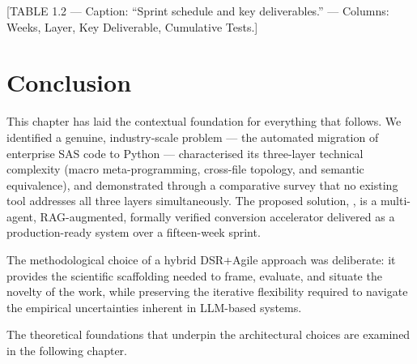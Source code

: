 [TABLE 1.2 --- Caption: ``Sprint schedule and key deliverables.'' --- Columns:
Weeks, Layer, Key Deliverable, Cumulative Tests.]

\section{Conclusion}
\label{sec:ch1-conclusion}

This chapter has laid the contextual foundation for everything that follows.
We identified a genuine, industry-scale problem --- the automated migration of
enterprise SAS code to Python --- characterised its three-layer technical
complexity (macro meta-programming, cross-file topology, and semantic
equivalence), and demonstrated through a comparative survey that no existing
tool addresses all three layers simultaneously. The proposed solution,
\codara{}, is a multi-agent, \ac{RAG}-augmented, formally verified conversion
accelerator delivered as a production-ready system over a fifteen-week sprint.

The methodological choice of a hybrid \ac{DSR}+Agile approach was deliberate:
it provides the scientific scaffolding needed to frame, evaluate, and situate
the novelty of the work, while preserving the iterative flexibility required
to navigate the empirical uncertainties inherent in \ac{LLM}-based systems.

The theoretical foundations that underpin the architectural choices are examined
in the following chapter.

%
